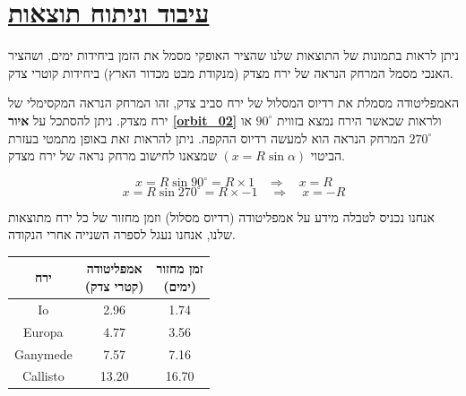 \documentclass[a4paper, 12pt]{article}
\begin{document}
    \vfill

    \pagebreak %

    \section{\underline{עיבוד וניתוח תוצאות}}
    \begin{flushright}
        ניתן לראות בתמונות של התוצאות שלנו שהציר האופקי
        מסמל את הזמן ביחידות ימים, ושהציר האנכי מסמל המרחק הנראה של ירח מצדק (מנקודת מבט מכדור הארץ)
        ביחידות קוטרי צדק.

        האמפליטודה מסמלת את רדיוס המסלול של ירח סביב צדק, זהו המרחק הנראה המקסימלי של ירח מצדק.
        ניתן להסתכל על \textbf{איור \ref{orbit_02}} ולראות שכאשר הירח נמצא בזווית 
        \textenglish{$90^\circ$} או \textenglish{$270^\circ$} 
        המרחק הנראה הוא למעשה רדיוס ההקפה. ניתן להראות זאת באופן מתמטי בעזרת הביטוי
        $( x = R\sin{\alpha} )$
        שמצאנו לחישוב מרחק נראה של ירח מצדק.

        $$ x = R\sin{90^\circ} = R\times 1 \quad \Rightarrow \quad x = R $$
        $$ x = R\sin{270^\circ} = R\times -1 \quad \Rightarrow \quad x = -R $$
    \end{flushright}

    \vspace{15pt}

    \begin{flushright}
        אנחנו נכניס לטבלה מידע על אמפליטודה (רדיוס מסלול) וזמן מחזור של כל ירח מתוצאות שלנו,
        אנחנו נעגל לספרה השנייה אחרי הנקודה.
    \end{flushright}

    \vspace{10pt}

    \begin{table}[h!]
        \centering
        \setlength{\tabcolsep}{10pt} %
        \begin{tabular}{ c c c }
            ירח & \makecell{אמפליטודה \\ (קטרי צדק)} & \makecell{זמן מחזור \\ (ימים)} \\
            \hline
            Io & 2.96 & 1.74 \\
            Europa & 4.77 & 3.56 \\ 
            Ganymede & 7.57 & 7.16 \\
            Callisto & 13.20 & 16.70 \\
        \end{tabular}
    \end{table}
\end{document}
